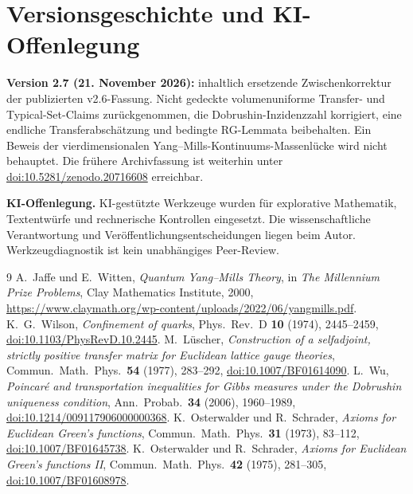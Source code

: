 \documentclass[11pt,a4paper]{article}
\theoremstyle{remark}
\begin{document}
\section*{Versionsgeschichte und KI-Offenlegung}
\textbf{Version 2.7 (21. November 2026):}
inhaltlich ersetzende Zwischenkorrektur
der publizierten v2.6-Fassung.
Nicht gedeckte volumenuniforme Transfer-
und Typical-Set-Claims zurückgenommen,
die Dobrushin-Inzidenzzahl korrigiert,
eine endliche Transferabschätzung
und bedingte RG-Lemmata beibehalten.
Ein Beweis der vierdimensionalen
Yang--Mills-Kontinuums-Massenlücke
wird nicht behauptet.
Die frühere Archivfassung ist weiterhin
unter
\href{https://doi.org/10.5281/zenodo.20716608}
{doi:10.5281/zenodo.20716608}
erreichbar.
\par\medskip
\textbf{KI-Offenlegung.}
KI-gestützte Werkzeuge wurden für
explorative Mathematik,
Textentwürfe und rechnerische
Kontrollen eingesetzt.
Die wissenschaftliche Verantwortung
und Veröffentlichungsentscheidungen
liegen beim Autor. Werkzeugdiagnostik
ist kein unabhängiges Peer-Review.

\begin{thebibliography}{9}\small
{}
A.~Jaffe und E.~Witten,
\emph{Quantum Yang--Mills Theory},
in \emph{The Millennium Prize Problems},
Clay Mathematics Institute, 2000,
\url{https://www.claymath.org/wp-content/uploads/2022/06/yangmills.pdf}.
K.~G.~Wilson,
\emph{Confinement of quarks},
Phys.\ Rev.\ D \textbf{10} (1974), 2445--2459,
\href{https://doi.org/10.1103/PhysRevD.10.2445}{doi:10.1103/PhysRevD.10.2445}.
M.~L\"uscher,
\emph{Construction of a selfadjoint, strictly positive transfer
matrix for Euclidean lattice gauge theories},
Commun.\ Math.\ Phys.\ \textbf{54} (1977), 283--292,
\href{https://doi.org/10.1007/BF01614090}{doi:10.1007/BF01614090}.
L.~Wu,
\emph{Poincar\'e and transportation inequalities for Gibbs
measures under the Dobrushin uniqueness condition},
Ann.\ Probab.\ \textbf{34} (2006), 1960--1989,
\href{https://doi.org/10.1214/009117906000000368}
{doi:10.1214/009117906000000368}.
K.~Osterwalder und R.~Schrader,
\emph{Axioms for Euclidean Green's functions},
Commun.\ Math.\ Phys.\ \textbf{31} (1973), 83--112,
\href{https://doi.org/10.1007/BF01645738}{doi:10.1007/BF01645738}.
K.~Osterwalder und R.~Schrader,
\emph{Axioms for Euclidean Green's functions II},
Commun.\ Math.\ Phys.\ \textbf{42} (1975), 281--305,
\href{https://doi.org/10.1007/BF01608978}{doi:10.1007/BF01608978}.
\end{thebibliography}
\end{document}
